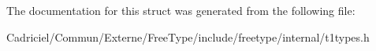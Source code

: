 The documentation for this struct was generated from the following file\-:\begin{DoxyCompactItemize}
\item 
Cadriciel/\-Commun/\-Externe/\-Free\-Type/include/freetype/internal/t1types.\-h\end{DoxyCompactItemize}

